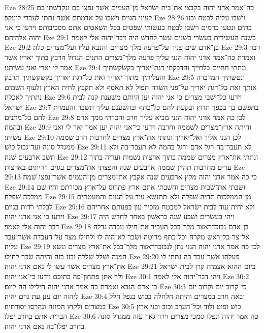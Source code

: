 Eze 28:25  כה־אמר אדני יהוה בקבצי את־בית ישׂראל מן־העמים אשׁר נפצו בם ונקדשׁתי בם לעיני הגוים וישׁבו על־אדמתם אשׁר נתתי לעבדי ליעקב׃
Eze 28:26  וישׁבו עליה לבטח ובנו בתים ונטעו כרמים וישׁבו לבטח בעשׂותי שׁפטים בכל השׁאטים אתם מסביבותם וידעו כי אני יהוה אלהיהם׃
Eze 29:1  בשׁנה העשׂירית בעשׂרי בשׁנים עשׂר לחדשׁ היה דבר־יהוה אלי לאמר׃
Eze 29:2  בן־אדם שׂים פניך על־פרעה מלך מצרים והנבא עליו ועל־מצרים כלה׃
Eze 29:3  דבר ואמרת כה־אמר אדני יהוה הנני עליך פרעה מלך־מצרים התנים הגדול הרבץ בתוך יאריו אשׁר אמר לי יארי ואני עשׂיתני׃
Eze 29:4  ונתתי חחיים בלחייך והדבקתי דגת־יאריך בקשׂקשׂתיך והעליתיך מתוך יאריך ואת כל־דגת יאריך בקשׂקשׂתיך תדבק׃
Eze 29:5  ונטשׁתיך המדברה אותך ואת כל־דגת יאריך על־פני השׂדה תפול לא תאסף ולא תקבץ לחית הארץ ולעוף השׁמים נתתיך לאכלה׃
Eze 29:6  וידעו כל־ישׁבי מצרים כי אני יהוה יען היותם משׁענת קנה לבית ישׂראל׃
Eze 29:7  בתפשׂם בך בכפך תרוץ ובקעת להם כל־כתף ובהשׁענם עליך תשׁבר והעמדת להם כל־מתנים׃
Eze 29:8  לכן כה אמר אדני יהוה הנני מביא עליך חרב והכרתי ממך אדם ובהמה׃
Eze 29:9  והיתה ארץ־מצרים לשׁממה וחרבה וידעו כי־אני יהוה יען אמר יאר לי ואני עשׂיתי׃
Eze 29:10  לכן הנני אליך ואל־יאריך ונתתי את־ארץ מצרים לחרבות חרב שׁממה ממגדל סונה ועד־גבול כושׁ׃
Eze 29:11  לא תעבר־בה רגל אדם ורגל בהמה לא תעבר־בה ולא תשׁב ארבעים שׁנה׃
Eze 29:12  ונתתי את־ארץ מצרים שׁממה בתוך ארצות נשׁמות ועריה בתוך ערים מחרבות תהיין שׁממה ארבעים שׁנה והפצתי את־מצרים בגוים וזריתים בארצות׃
Eze 29:13  כי כה אמר אדני יהוה מקץ ארבעים שׁנה אקבץ את־מצרים מן־העמים אשׁר־נפצו שׁמה׃
Eze 29:14  ושׁבתי את־שׁבות מצרים והשׁבתי אתם ארץ פתרוס על־ארץ מכורתם והיו שׁם ממלכה שׁפלה׃
Eze 29:15  מן־הממלכות תהיה שׁפלה ולא־תתנשׂא עוד על־הגוים והמעטתים לבלתי רדות בגוים׃
Eze 29:16  ולא יהיה־עוד לבית ישׂראל למבטח מזכיר עון בפנותם אחריהם וידעו כי אני אדני יהוה׃
Eze 29:17  ויהי בעשׂרים ושׁבע שׁנה בראשׁון באחד לחדשׁ היה דבר־יהוה אלי לאמר׃
Eze 29:18  בן־אדם נבוכדראצר מלך־בבל העביד את־חילו עבדה גדלה אל־צר כל־ראשׁ מקרח וכל־כתף מרוטה ושׂכר לא־היה לו ולחילו מצר על־העבדה אשׁר־עבד עליה׃
Eze 29:19  לכן כה אמר אדני יהוה הנני נתן לנבוכדראצר מלך־בבל את־ארץ מצרים ונשׂא המנה ושׁלל שׁללה ובזז בזה והיתה שׂכר לחילו׃
Eze 29:20  פעלתו אשׁר־עבד בה נתתי לו את־ארץ מצרים אשׁר עשׂו לי נאם אדני יהוה׃
Eze 29:21  ביום ההוא אצמיח קרן לבית ישׂראל ולך אתן פתחון־פה בתוכם וידעו כי־אני יהוה׃
Eze 30:1  ויהי דבר־יהוה אלי לאמר׃
Eze 30:2  בן־אדם הנבא ואמרת כה אמר אדני יהוה הילילו הה ליום׃
Eze 30:3  כי־קרוב יום וקרוב יום ליהוה יום ענן עת גוים יהיה׃
Eze 30:4  ובאה חרב במצרים והיתה חלחלה בכושׁ בנפל חלל במצרים ולקחו המונה ונהרסו יסודתיה׃
Eze 30:5  כושׁ ופוט ולוד וכל־הערב וכוב ובני ארץ הברית אתם בחרב יפלו׃
Eze 30:6  כה אמר יהוה ונפלו סמכי מצרים וירד גאון עזה ממגדל סונה בחרב יפלו־בה נאם אדני יהוה׃
